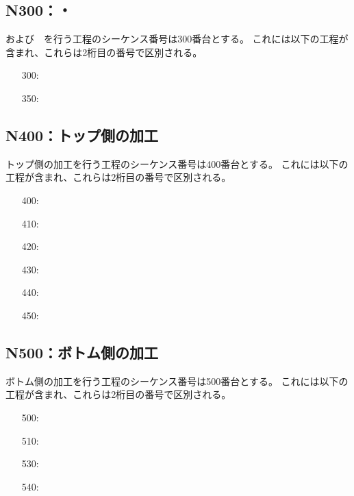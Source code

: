 \subsection{N300：\DimpleMilling ・\ReliefGrooveMilling}
\DimpleMilling および\ReliefGrooveMilling　を行う工程のシーケンス番号は300番台とする。
これには以下の工程が含まれ、これらは2桁目の番号で区別される。
\begin{enumerate}
\item[300:] \DimpleMilling
\item[350:] \ReliefGrooveMilling
\end{enumerate}


\subsection{N400：トップ側の加工}
トップ側の加工を行う工程のシーケンス番号は400番台とする。
これには以下の工程が含まれ、これらは2桁目の番号で区別される。
\begin{enumerate}
\item[400:] \TopEndFacecutMilling
\item[410:] \TopOutcutMilling
\item[420:] \KeywayMilling
\item[430:] \TopEndFaceOutCChamferMilling
\item[440:] \TopEndFaceInCChamferMilling
\item[450:] \EndFaceBoringMilling
\end{enumerate}


\clearpage
\subsection{N500：ボトム側の加工}
ボトム側の加工を行う工程のシーケンス番号は500番台とする。
これには以下の工程が含まれ、これらは2桁目の番号で区別される。
\begin{enumerate}
\item[500:] \BottomEndFacecutMilling
\item[510:] \BottomOutcutMilling
\item[530:] \BottomEndFaceOutCChamferMilling
\item[540:] \BottomEndFaceInCChamferMilling
\end{enumerate}


